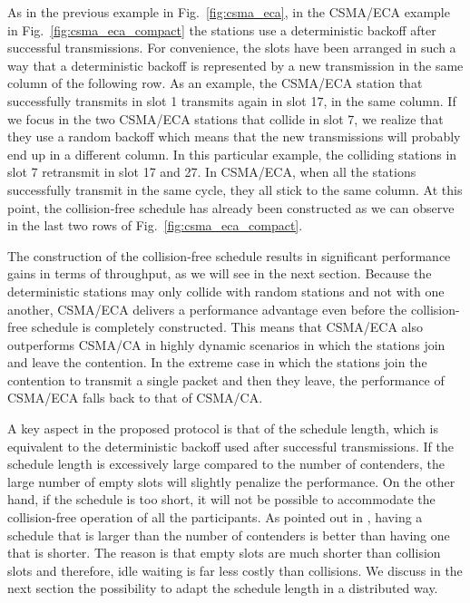 \documentclass[journal]{IEEEtran}
\begin{document}
As in the previous example in Fig.~\ref{fig:csma_eca}, in the CSMA/ECA example in Fig.~\ref{fig:csma_eca_compact} the stations use a deterministic backoff after successful transmissions.
For convenience, the slots have been arranged in such a way that a deterministic backoff is represented by a new transmission in the same column of the following row.
As an example, the CSMA/ECA station that successfully transmits in slot 1 transmits again in slot 17, in the same column.
If we focus in the two CSMA/ECA stations that collide in slot 7, we realize that they use a random backoff which means that the new transmissions will probably end up in a different column.
In this particular example, the colliding stations in slot 7 retransmit in slot 17 and 27.
In CSMA/ECA, when all the stations successfully transmit in the same cycle, they all stick to the same column.
At this point, the collision-free schedule has already been constructed as we can observe in the last two rows of Fig.~\ref{fig:csma_eca_compact}.

The construction of the collision-free schedule results in significant performance gains in terms of throughput, as we will see in the next section.
Because the deterministic stations may only collide with random stations and not with one another, CSMA/ECA delivers a performance advantage even before the collision-free schedule is completely constructed.
This means that CSMA/ECA also outperforms CSMA/CA in highly dynamic scenarios in which the stations join and leave the contention.
In the extreme case in which the stations join the contention to transmit a single packet and then they leave, the performance of CSMA/ECA falls back to that of CSMA/CA.

A key aspect in the proposed protocol is that of the schedule length, which is equivalent to the deterministic backoff used after successful transmissions.
If the schedule length is excessively large compared to the number of contenders, the large number of empty slots will slightly penalize the performance.
On the other hand, if the schedule is too short, it will not be possible to accommodate the collision-free operation of all the participants.
As pointed out in \cite{fang2011dlm}, having a schedule that is larger than the number of contenders is better than having one that is shorter.
The reason is that empty slots are much shorter than collision slots and therefore, idle waiting is far less costly than collisions.
We discuss in the next section the possibility to adapt the schedule length in a distributed way.
\end{document}
